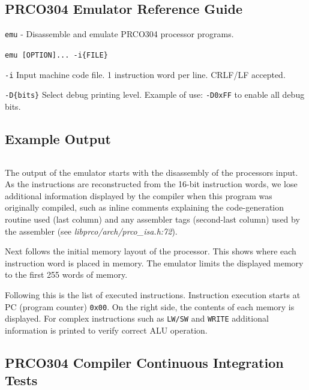 \documentclass[11pt,a4paper]{report}
\newcommand{\scname}{PRCO304}
\begin{document}
\subsection{\scname{} Emulator Reference Guide}
\label{sect:emulator_cli}
\begin{description}[style=nextline]
\item [Name]
\verb|emu| - Disassemble and emulate \scname{} processor programs.

\item[Synopsis]
\verb|emu [OPTION]... -i{FILE}|

\item [Description]
\verb|-i| Input machine code file. 1 instruction word per line. CRLF/LF accepted.

\verb|-D{bits}| Select debug printing level. Example of use: \verb|-D0xFF| to enable all debug bits. 
\end{description}


\subsection*{Example Output}
\inputminted{text}{emu_output.tex}
\scriptsize
The output of the emulator starts with the disassembly of the processors input. As the instructions are reconstructed from the 16-bit instruction words, we lose additional information displayed by the compiler when this program was originally compiled, such as inline comments explaining the code-generation routine used (last column) and any assembler tags (second-last column) used by the assembler (see \textit{libprco/arch/prco\_isa.h:72}).

Next follows the initial memory layout of the processor. This shows where each instruction word is placed in memory. The emulator limits the displayed memory to the first 255 words of memory.

Following this is the list of executed instructions. Instruction execution starts at PC  (program counter) \verb|0x00|. On the right side, the contents of each memory is displayed. For complex instructions such as \verb|LW/SW| and \verb|WRITE| additional information is printed to verify correct ALU operation.
\normalsize

\subsection{\scname{} Compiler Continuous Integration Tests}
\label{appendix:travisci}
\inputminted{text}{compiler_ci.txt}
\end{document}
